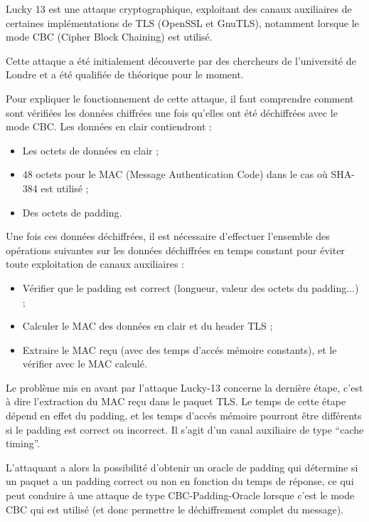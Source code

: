 \vspace{1em}

Lucky 13 est une attaque cryptographique, exploitant des canaux auxiliaires de certaines implémentations de TLS (OpenSSL et GnuTLS), notamment lorsque le mode CBC (Cipher Block Chaining) est utilisé.

Cette attaque a été initialement découverte par des chercheurs de l'université de Londre et a été qualifiée de théorique pour le moment.

Pour expliquer le fonctionnement de cette attaque, il faut comprendre comment sont vérifiées les données chiffrées une fois qu'elles ont été déchiffrées avec le mode CBC. Les données en clair contiendront :

\begin{itemize}
\item{Les octets de données en clair ;}
\item{48 octets pour le MAC (Message Authentication Code) dans le cas où SHA-384 est utilisé ;}
\item{Des octets de padding.}
\end{itemize}

Une fois ces données déchiffrées, il est nécessaire d'effectuer l'ensemble des opérations suivantes sur les données déchiffrées en temps constant pour éviter toute exploitation de canaux auxiliaires :

\begin{itemize}
\item{Vérifier que le padding est correct (longueur, valeur des octets du padding...) ;}
\item{Calculer le MAC des données en clair et du header TLS ;}
\item{Extraire le MAC reçu (avec des temps d'accés mémoire constants), et le vérifier avec le MAC calculé.}
\end{itemize}

Le problème mis en avant par l'attaque Lucky-13 concerne la dernière étape, c'est à dire l'extraction du MAC reçu dans le paquet TLS. Le temps de cette étape dépend en effet du padding, et les temps d'accés mémoire pourront être différents si le padding est correct ou incorrect. Il s'agit d'un canal auxiliaire de type ``cache timing''.

L'attaquant a alors la possibilité d'obtenir un oracle de padding qui détermine si un paquet a un padding correct ou non en fonction du temps de réponse, ce qui peut conduire à une attaque de type CBC-Padding-Oracle lorsque c'est le mode CBC qui est utilisé (et donc permettre le déchiffrement complet du message).

